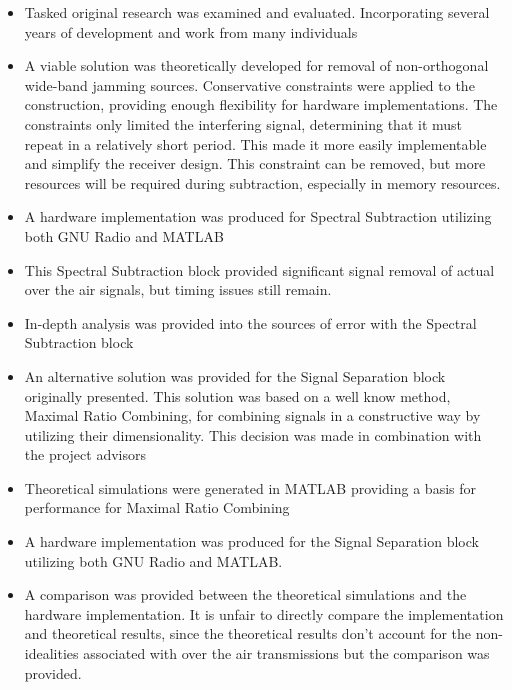 \begin{itemize}

\item Tasked original research was examined and evaluated. Incorporating several years of development and work from many individuals

\item A viable solution was theoretically developed for removal of non-orthogonal wide-band jamming sources.  Conservative constraints were applied to the construction, providing enough flexibility for hardware implementations.  The constraints only limited the interfering signal, determining that it must repeat in a relatively short period.  This made it more easily implementable and simplify the receiver design.  This constraint can be removed, but more resources will be required during subtraction, especially in memory resources.

\item A hardware implementation was produced for Spectral Subtraction utilizing both GNU Radio and MATLAB

\item This Spectral Subtraction block provided significant signal removal of actual over the air signals, but timing issues still remain.

\item In-depth analysis was provided into the sources of error with the Spectral Subtraction block

\item An alternative solution was provided for the Signal Separation block originally presented.  This solution was based on a well know method, Maximal Ratio Combining, for combining signals in a constructive way by utilizing their dimensionality.  This decision was made in combination with the project advisors

\item Theoretical simulations were generated in MATLAB providing a basis for performance for Maximal Ratio Combining

\item A hardware implementation was produced for the Signal Separation block utilizing both GNU Radio and MATLAB.

\item A comparison was provided between the theoretical simulations and the hardware implementation.  It is unfair to directly compare the implementation and theoretical results, since the theoretical results don't account for the non-idealities associated with over the air transmissions but the comparison was provided. 

\end{itemize}

